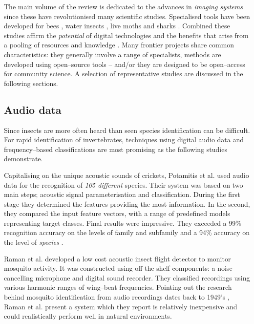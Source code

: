 The main volume of the review is dedicated to the advances in \emph{imaging systems} since these have revolutionised many scientific studies. Specialised tools have been developed for bees \cite{Roth1999,Arbuckle2001,Steinhage2001}, water insects \cite{Larios2010,Lytle2010}, live moths \cite{Lone2011} and sharks \cite{Towner2013,Van2007}. Combined these studies affirm the \emph{potential} of digital technologies and the benefits that arise from a pooling of resources and knowledge \cite{Kaku1999}. Many frontier projects share common characteristics: they generally involve a range of specialists, methods are developed using open--source tools -- and/or they are designed to be open--access for community science. A selection of representative studies are discussed in the following sections.

\subsection{Audio data}\label{sec:audio-data}
Since insects are more often heard than seen species identification can be difficult. For rapid identification of invertebrates, techniques using digital audio data and frequency--based classifications are most promising as the following studies demonstrate.

Capitalising on the unique acoustic sounds of crickets, Potamitis et al. \cite{Potamitis2006} used audio data for the recognition of \emph{105 different} species. Their system was based on two main steps; acoustic signal parameterisation and classification. During the first stage they determined the features providing the most information. In the second, they compared the input feature vectors, with a range of predefined models representing target classes. Final results were impressive. They exceeded a 99\% recognition accuracy on the levels of family and subfamily and a 94\% accuracy on the level of \emph{species} \cite{Potamitis2006}.

Raman et al. \cite{Raman2007} developed a low cost acoustic insect flight detector to monitor mosquito activity. It was constructed using off the shelf components: a noise cancelling microphone and digital sound recorder. They classified recordings using various harmonic ranges of wing--beat frequencies. Pointing out the research behind mosquito identification from audio recordings dates back to 1949's \cite{Offenhauser1949}, Raman et al. \cite{Raman2007} present a system which they report is relatively inexpensive and could realistically perform well in natural environments.

